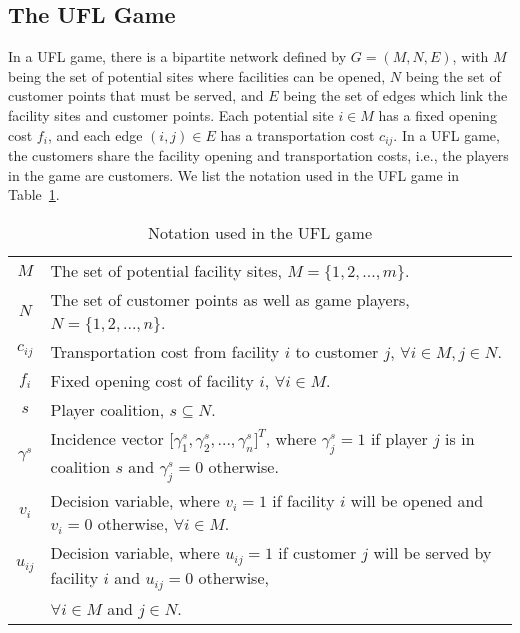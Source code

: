 \subsection{The UFL Game}\label{section:UFL}
In a UFL game, there is a bipartite network defined by $G=(M,N,E)$, with $M$ being the set of potential sites where facilities can be opened, $N$ being the set of customer points that must be served, and $E$ being the set of edges which link the facility sites and customer points. Each potential site $i \in M$ has a fixed opening cost $f_i$, and each edge $(i,j) \in E$ has a transportation cost $c_{ij}$. In a UFL game, the customers share the facility opening and transportation costs, i.e., the players in the game are customers.
We list the notation  used in the UFL game in Table~\ref{table:notationsUFL}.
\begin{table}[H]
\vspace{-2mm}
\tabcolsep=7pt
\small
\renewcommand\arraystretch{1.5}
\caption{\label{table:notationsUFL} Notation used in the UFL game}
\begin{tabular}[!h]{c c}
\hline
\multicolumn{1}{c}{$M$} &\multicolumn{1}{l}{The set of potential facility sites, $M=\big\{1,2,...,m\big\}$.}\\
\multicolumn{1}{c}{$N$} &\multicolumn{1}{l}{The set of customer points as well as game players, $N=\big\{1,2,...,n\big\}$.}\\
\multicolumn{1}{c}{$c_{ij}$} &\multicolumn{1}{l}{Transportation cost from facility $i$ to customer $j$, $\forall i \in M, j \in N$.}\\
\multicolumn{1}{c}{$f_i$} &\multicolumn{1}{l}{Fixed opening cost of facility $i$, $\forall i \in M$.}\\
\multicolumn{1}{c}{$s$} &\multicolumn{1}{l}{Player coalition, $s \subseteq N$.}\\
\multicolumn{1}{c}{$\gamma^s$} &\multicolumn{1}{l}{Incidence vector $\big[ \gamma^{s}_1,\gamma^{s}_2,...,\gamma^{s}_{n}\big]^T$, where $\gamma^{s}_j=1$ if player $j$ is in coalition $s$ and $\gamma^{s}_j=0$ otherwise.}\\
\multicolumn{1}{c}{$v_i$} &\multicolumn{1}{l}{Decision variable, where $v_i=1$ if facility $i$ will be opened and $v_i=0$ otherwise, $\forall i \in M$.}\\
\multicolumn{1}{c}{$u_{ij}$} &\multicolumn{1}{l}{Decision variable, where $u_{ij}=1$ if customer $j$ will be served by facility $i$ and $u_{ij}=0$ otherwise,}\\
\multicolumn{1}{c}{} &\multicolumn{1}{l}{ $\forall i \in M$ and $j \in N$.}\\
\hline
\end{tabular}
\vspace{-3mm}
\end{table}


